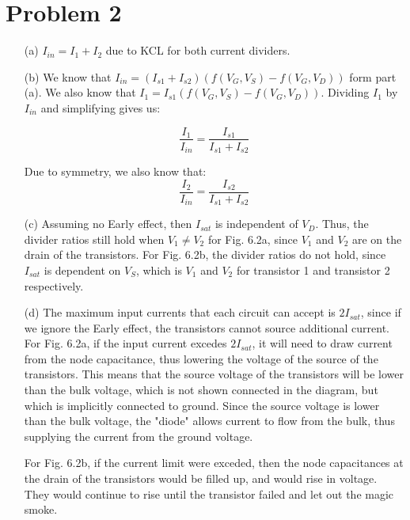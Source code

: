 \documentclass{article}
\begin{document}
\section{Problem 2}
\begin{itemize}
    \item[(a)]
        $I_{in} = I_1 + I_2$ due to KCL for both current dividers.

    \item[(b)]
        We know that $I_{in} = (I_{s1} + I_{s2})(f(V_G,V_S) - f(V_G,V_D))$ form part (a). We also know that $I_1 = I_{s1}(f(V_G,V_S) - f(V_G,V_D))$. Dividing $I_1$ by $I_{in}$ and simplifying gives us:

        \begin{equation}
            \frac{I_1}{I_{in}} = \frac{I_{s1}}{I_{s1} + I_{s2}}
        \end{equation}

        Due to symmetry, we also know that:
        \begin{equation}
            \frac{I_2}{I_{in}} = \frac{I_{s2}}{I_{s1} + I_{s2}}
        \end{equation}

    \item[(c)]
        Assuming no Early effect, then $I_{sat}$ is independent of $V_D$. Thus, the divider ratios still hold when $V_1 \ne V_2$ for Fig. 6.2a, since $V_1$ and $V_2$ are on the drain of the transistors. For Fig. 6.2b, the divider ratios do not hold, since $I_{sat}$ is dependent on $V_S$, which is $V_1$ and $V_2$ for transistor 1 and transistor 2 respectively.

    \item[(d)]
        The maximum input currents that each circuit can accept is $2I_{sat}$, since if we ignore the Early effect, the transistors cannot source additional current. For Fig. 6.2a, if the input current excedes $2I_{sat}$, it will need to draw current from the node capacitance, thus lowering the voltage of the source of the transistors. This means that the source voltage of the transistors will be lower than the bulk voltage, which is not shown connected in the diagram, but which is implicitly connected to ground. Since the source voltage is lower than the bulk voltage, the "diode" allows current to flow from the bulk, thus supplying the current from the ground voltage.

        For Fig. 6.2b, if the current limit were exceded, then the node capacitances at the drain of the transistors would be filled up, and would rise in voltage. They would continue to rise until the transistor failed and let out the magic smoke.

\end{itemize}
\end{document}
